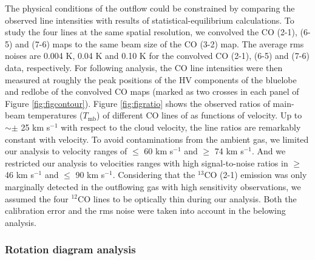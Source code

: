 The physical conditions of the outflow could be constrained by comparing the observed line intensities with results of statistical-equilibrium calculations. To study the four lines at the same spatial resolution, we convolved the CO (2-1), (6-5) and (7-6) maps to the same beam size of the CO (3-2) map. The average rms noises are 0.004 K, 0.04 K and 0.10 K for the convolved CO (2-1), (6-5) and (7-6) data, respectively. For following analysis, the CO line intensities were then measured at roughly the peak positions of the HV components of the bluelobe and redlobe of the convolved CO maps (marked as two crosses in each panel of Figure \ref{fig:figcontour}). Figure \ref{fig:figratio} shows the observed ratios of main-beam temperatures ($T_{\mathrm{mb}}$) of different CO lines of as functions of velocity. Up to $\sim \pm$ 25 km s$^{-1}$ with respect to the cloud velocity, the line ratios are remarkably constant with velocity. To avoid contaminations from the ambient gas, we limited our analysis to velocity ranges of $\le$ 60 km s$^{-1}$ and $\ge$ 74 km s$^{-1}$. And we restricted our analysis to velocities ranges with high signal-to-noise ratios in $\ge$ 46 km s$^{-1}$ and $\le$ 90 km s$^{-1}$. Considering that the $^{13}$CO (2-1) emission was only marginally detected in the outflowing gas with high sensitivity observations\citep{2009ApJ...696...66Q}, we assumed the four $^{12}$CO lines to be optically thin during our analysis. Both the calibration error and the rms noise were taken into account in the belowing analysis.

\subsubsection{Rotation diagram analysis\label{subsec:RD}}

